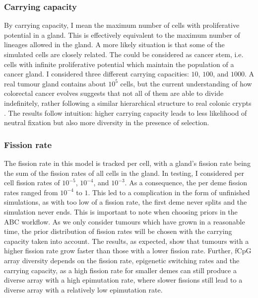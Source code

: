 \subsubsection{Carrying capacity}
By carrying capacity, I mean the maximum number of cells with proliferative
potential in a gland. This is effectively equivalent to the maximum number of
lineages allowed in the gland. A more likely situation is that some of the
simulated cells are closely related. The could be considered as cancer stem,
i.e. cells with infinite proliferative potential which maintain the population
of a cancer gland. I considered three different carrying capacities: $10$,
$100$, and $1000$. A real tumour gland contains about $10^5$ cells, but the
current understanding of how colorectal cancer evolves suggests that not all of
them are able to divide indefinitely, rather following a similar hierarchical
structure to real colonic crypts \cite{cernat_colorectal_2014}. The results
follow intuition: higher carrying capacity leads to less likelihood of neutral
fixation but also more diversity in the presence of selection.

\subsubsection{Fission rate}
The fission rate in this model is tracked per cell, with a gland's fission rate
being the sum of the fission rates of all cells in the gland. In testing, I
considered per cell fission rates of $10^{-5}$, $10^{-4}$, and $10^{-3}$. As a
consequence, the per deme fission rates ranged from $10^{-4}$ to $1$. This led
to a complication in the form of unfinished simulations, as with too low of a
fission rate, the first deme never splits and the simulation never ends. This
is important to note when choosing priors in the ABC workflow. As we only
consider tumours which have grown in a reasonable time, the prior distribution
of fission rates will be chosen with the carrying capacity taken into account.
The results, as expected, show that tumours with a higher fission rate grow
faster than those with a lower fission rate. Further, fCpG array diversity
depends on the fission rate, epigenetic switching rates and the carrying
capacity, as a high fission rate for smaller demes can still produce a diverse
array with a high epimutation rate, where slower fissions still lead to a
diverse array with a relatively low epimutation rate.

